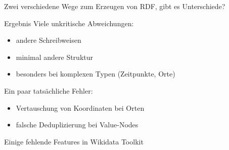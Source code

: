 \documentclass[aspectratio=1609,xcolor=usenames,dvipsnames,svgnames]{beamer}
\begin{document}
\begin{frame}
\begin{center}
  \end{center}

  Zwei verschiedene Wege zum Erzeugen von RDF, gibt es Unterschiede?
\end{frame}

\begin{frame}{Ergebnis}
  Viele unkritische Abweichungen:
  \begin{itemize}
    \item andere Schreibweisen
    \item minimal andere Struktur
    \item besonders bei komplexen Typen (Zeitpunkte, Orte)
  \end{itemize}

  Ein paar tatsächliche Fehler:
  \begin{itemize}
      \item Vertauschung von Koordinaten bei Orten
      \item falsche Deduplizierung bei Value-Nodes
  \end{itemize}

  Einige fehlende Features in Wikidata Toolkit
\end{frame}
\end{document}
